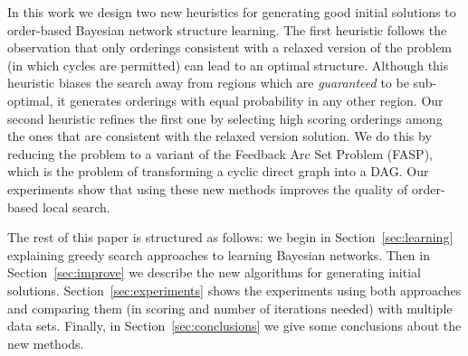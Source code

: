 
In this work we design two new heuristics for generating good initial solutions to order-based Bayesian network structure learning. The first heuristic follows the observation that only orderings consistent with a relaxed version of the problem (in which cycles are permitted) can lead to an optimal structure. Although this heuristic biases the search away from regions which are \emph{guaranteed} to be sub-optimal, it generates orderings with equal probability in any other region. Our second heuristic refines the first one by selecting high scoring orderings among the ones that are consistent with the relaxed version solution. We do this by reducing the problem to a variant of the Feedback Arc Set Problem (FASP), which is the problem of transforming a cyclic direct graph into a DAG. Our experiments show that using these new methods improves the quality of order-based local search.

The rest of this paper is structured as follows: we begin in Section~\ref{sec:learning} explaining greedy search approaches to learning Bayesian networks. Then in Section~\ref{sec:improve} we describe the new algorithms for generating initial solutions. Section~\ref{sec:experiments} shows the experiments using both approaches and comparing them (in scoring and number of iterations needed) with multiple data sets. Finally, in Section~\ref{sec:conclusions} we give
some conclusions about the new methods.
